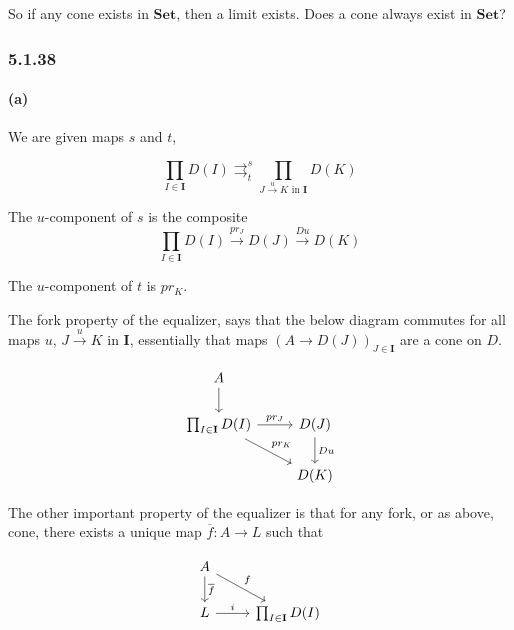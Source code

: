 \documentclass{article}
\begin{document}
So if any cone exists in $\mathbf{Set}$, then a limit exists. Does a cone always exist in $\mathbf{Set}$?

\subsubsection*{5.1.38}
\paragraph{(a)}

We are given maps $s$ and $t$,

\begin{equation*}
  \prod_{I \in \mathbf{I}} D(I) \mathop{\rightrightarrows}_t^{s} \prod_{J \xrightarrow{u} K \text{ in } \mathbf{I}} D(K)
\end{equation*}

The $u$-component of $s$ is the composite
\begin{equation*}
  \prod_{I \in \mathbf{I}}D(I) \xrightarrow{pr_J} D(J) \xrightarrow{Du} D(K)
\end{equation*}

The $u$-component of $t$ is $pr_K$.

The fork property of the equalizer, says that the below diagram commutes for all maps $u$, $J \xrightarrow{u} K \text{ in } \mathbf{I}$, essentially that maps $(A \rightarrow D(J))_{J \in \mathbf{I}}$ are a cone on $D$.

\begin{equation}
\label{eqn:5138a}
\begin{tikzcd}
  A \arrow{d} &\\
  \prod_{I \in \mathbf{I}}D(I) \arrow{r}{pr_J} \arrow{rd}{pr_K}
  & D(J) \arrow{d}{Du} \\
    & D(K)
  \end{tikzcd}
\end{equation}

The other important property of the equalizer is that for any fork, or as above, cone, there exists a unique map $\overline{f} \colon A \rightarrow L$ such that

\begin{equation}
\label{eqn:5138b}
\begin{tikzcd}
  A \arrow{d}{\overline{f}} \arrow{dr}{f} & \\
  L \arrow{r}{i} & \prod_{I \in \mathbf{I}}D(I)
\end{tikzcd}
\end{equation}
\end{document}
